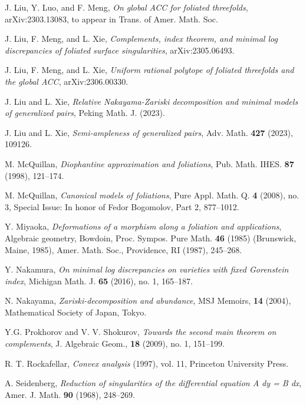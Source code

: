 \documentclass[11pt]{amsart}
\numberwithin{equation}{section}
\theoremstyle{definition}
\theoremstyle{definition}
\theoremstyle{definition}
\begin{document}
\begin{thebibliography}{99}
   J. Liu, Y. Luo, and F. Meng, \textit{On global ACC for foliated threefolds}, arXiv:2303.13083, to appear in Trans. of Amer. Math. Soc.

   J. Liu, F. Meng, and L. Xie, \textit{Complements, index theorem, and minimal log discrepancies of foliated surface singularities}, arXiv:2305.06493.

   J. Liu, F. Meng, and L. Xie, \textit{Uniform rational polytope of foliated threefolds and the global ACC}, arXiv:2306.00330.

   J. Liu and L. Xie, \textit{Relative Nakayama-Zariski decomposition and minimal models of generalized pairs}, Peking Math. J. (2023).

   J. Liu and L. Xie, \textit{Semi-ampleness of generalized pairs}, Adv. Math. \textbf{427} (2023), 109126.

   M. McQuillan, \textit{Diophantine approximation and foliations}, Pub. Math. IHES. \textbf{87} (1998), 121--174.

   M. McQuillan, \textit{Canonical models of foliations}, Pure Appl. Math. Q. \textbf{4} (2008), no. 3, Special Issue: In honor of Fedor Bogomolov, Part 2, 877--1012.

   Y. Miyaoka, \textit{Deformations of a morphism along a foliation and applications}, Algebraic geometry, Bowdoin, Proc. Sympos. Pure Math. \textbf{46} (1985) (Brunswick, Maine, 1985), Amer. Math. Soc., Providence, RI (1987), 245--268.


   Y. Nakamura, \textit{On minimal log discrepancies on varieties with fixed Gorenstein index}, Michigan Math. J. \textbf{65} (2016), no. 1, 165--187.

   N. Nakayama, \textit{Zariski-decomposition and abundance}, MSJ Memoirs, \textbf{14} (2004), Mathematical Society of Japan, Tokyo.

   Y.G. Prokhorov and V. V. Shokurov, \textit{Towards the second main theorem on complements}, J. Algebraic Geom., \textbf{18} (2009), no. 1, 151--199.

    R. T. Rockafellar, \textit{Convex analysis} (1997), vol. 11, Princeton University Press.

   A. Seidenberg, \textit{Reduction of singularities of the differential equation A dy = B dx}, Amer. J. Math. \textbf{90} (1968), 248--269.


\end{thebibliography}
\end{document}

